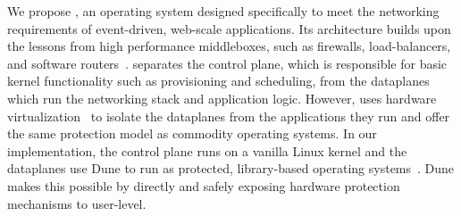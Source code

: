 


We propose \ix, an operating system designed specifically to meet the
networking requirements of event-driven, web-scale applications.  Its
architecture builds upon the lessons from high performance
middleboxes, such as firewalls, load-balancers, and software
routers~\cite{DBLP:journals/tocs/KohlerMCJK00,DBLP:conf/sosp/DobrescuEACFIKMR09}. \ix
separates the control plane, which is responsible for basic kernel
functionality such as provisioning and scheduling, from the dataplanes
which run the networking stack and application logic. However, \ix
uses hardware virtualization~\cite{DBLP:journals/computer/UhligNRSMABKLS05} to isolate the
dataplanes from the applications they run and offer
the same protection model as commodity operating systems. In our
implementation, the control plane runs on a vanilla Linux kernel and
the dataplanes use Dune to run \ix as protected, library-based
operating systems~\cite{belay2012dune}.  Dune makes this
possible by directly and safely exposing hardware protection mechanisms
to user-level.

